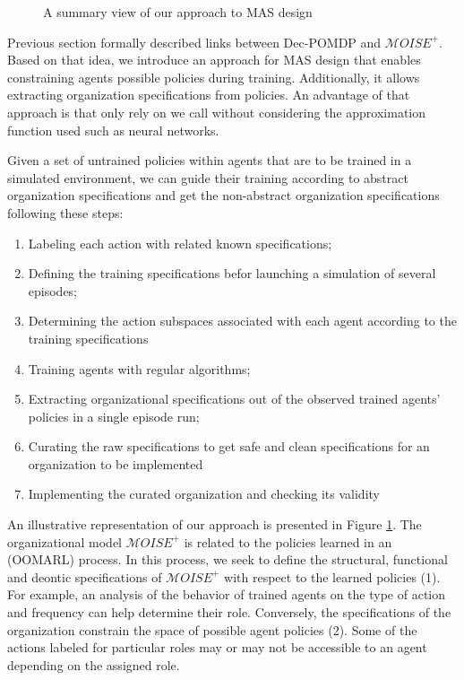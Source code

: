 \documentclass[runningheads]{llncs}
\begin{document}
\begin{figure}[h!]
    \centering
    
    \caption{A summary view of our approach to MAS design}
    \label{fig:design_approach}
\end{figure}

Previous section formally described links between Dec-POMDP and $\mathcal{M}OISE^+$. Based on that idea, we introduce an approach for MAS design that enables constraining agents possible policies during training. Additionally, it allows extracting organization specifications from policies. An advantage of that approach is that only rely on  we call  without considering the approximation function used such as neural networks.

Given a set of untrained policies within agents that are to be trained in a simulated environment, we can guide their training according to abstract organization specifications and get the non-abstract organization specifications following these steps:
\begin{enumerate}
    \item Labeling each action with related known specifications;
    \item Defining the training specifications befor launching a simulation of several episodes;
    \item Determining the action subspaces associated with each agent according to the training specifications
    \item Training agents with regular algorithms;
    \item Extracting organizational specifications out of the observed trained agents' policies in a single episode run;
    \item Curating the raw specifications to get safe and clean specifications for an organization to be implemented
    \item Implementing the curated organization and checking its validity
\end{enumerate}

An illustrative representation of our approach is presented in Figure \ref{fig:design_approach}. The organizational model $\mathcal{M}OISE^{+}$ is related to the policies learned in an  (OOMARL) process. In this process, we seek to define the structural, functional and deontic specifications of $\mathcal{M}OISE^{+}$ with respect to the learned policies (1). For example, an analysis of the behavior of trained agents on the type of action and frequency can help determine their role. Conversely, the specifications of the organization constrain the space of possible agent policies (2). Some of the actions labeled for particular roles may or may not be accessible to an agent depending on the assigned role.
\end{document}
